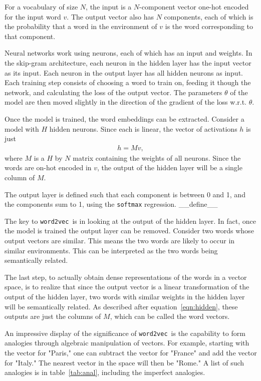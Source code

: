 \documentclass{article} %
\newcommand{\wordtvec}{\texttt{word2vec}}
\begin{document}
For a vocabulary of size $N$, the input is a $N$-component vector one-hot encoded for the input word $v$. The output vector also has $N$ components, each of which is the probability that a word in the environment of $v$ is the word corresponding to that component. 

Neural networks work using neurons, each of which has an input and weights. In the skip-gram architecture, each neuron in the hidden layer has the input vector as its input. Each neuron in the output layer has all hidden neurons as input. Each training step consists of choosing a word to train on, feeding it though the network, and calculating the loss of the output vector. The parameters $\theta$ of the model are then moved slightly in the direction of the gradient of the loss w.r.t. $\theta$.

Once the model is trained, the word embeddings can be extracted. Consider a model with $H$ hidden neurons. Since each is linear, the vector of activations $h$ is just
\begin{align}
h=Mv, \label{eqn:hidden}
\end{align}
where $M$ is a $H$ by $N$ matrix containing the weights of all neurons. Since the words are on-hot encoded in $v$, the output of the hidden layer will be a single column of $M$. 

The output layer is defined such that each component is between 0 and 1, and the components sum to 1, using the \texttt{softmax} regression. \_\_define\_\_

The key to \wordtvec\ is in looking at the output of the hidden layer. In fact, once the model is trained the output layer can be removed. Consider two words whose output vectors are similar. This means the two words are likely to occur in similar environments. This can be interpreted as the two words being semantically related. 

The last step, to actually obtain dense representations of the words in a vector space, is to realize that since the output vector is a linear transformation of the output of the hidden layer, two words with similar weights in the hidden layer will be semantically related. As described after equation~\ref{eqn:hidden}, these outputs are just the columns of $M$, which can be called the word vectors. 

An impressive display of the significance of \wordtvec\ is the capability to form analogies through algebraic manipulation of vectors. For example, starting with the vector for "Paris," one can subtract the vector for "France" and add the vector for "Italy." The nearest vector in the space will then be "Rome." A list of such analogies is in table~\ref{tab:anal}, including the imperfect analogies.
\end{document}
